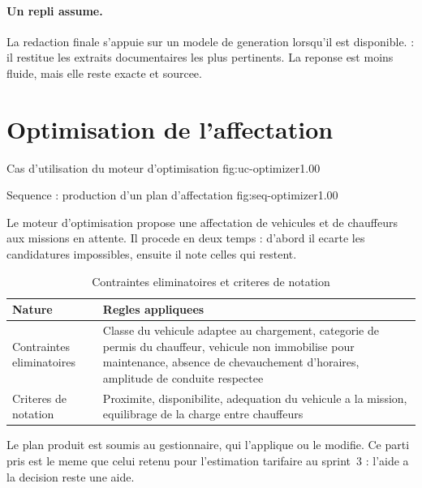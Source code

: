 \paragraph{Un repli assume.}
La redaction finale s'appuie sur un modele de generation lorsqu'il est
disponible.  : il restitue les extraits documentaires les plus pertinents. La
reponse est moins fluide, mais elle reste exacte et sourcee.

\section{Optimisation de l'affectation}

  {Cas d'utilisation du moteur d'optimisation}
  {fig:uc-optimizer}{1.00}

  {Sequence : production d'un plan d'affectation}
  {fig:seq-optimizer}{1.00}

Le moteur d'optimisation propose une affectation de vehicules et de
chauffeurs aux missions en attente. Il procede en deux temps
 : d'abord il ecarte les
candidatures impossibles, ensuite il note celles qui restent.

\begin{table}[H]
\centering
\caption{Contraintes eliminatoires et criteres de notation}
\label{tab:optimisation}
\small
\begin{tabularx}{\textwidth}{@{}p{3.6cm}X@{}}
\toprule
\textbf{Nature} & \textbf{Regles appliquees} \\ \midrule
Contraintes eliminatoires & Classe du vehicule adaptee au chargement,
  categorie de permis du chauffeur, vehicule non immobilise pour
  maintenance, absence de chevauchement d'horaires, amplitude de conduite
  respectee \\
Criteres de notation & Proximite, disponibilite, adequation du vehicule a
  la mission, equilibrage de la charge entre chauffeurs \\
\bottomrule
\end{tabularx}
\end{table}

 Le plan produit est
soumis au gestionnaire, qui l'applique ou le modifie. Ce parti pris est le
meme que celui retenu pour l'estimation tarifaire au sprint~3 : l'aide a
la decision reste une aide.

